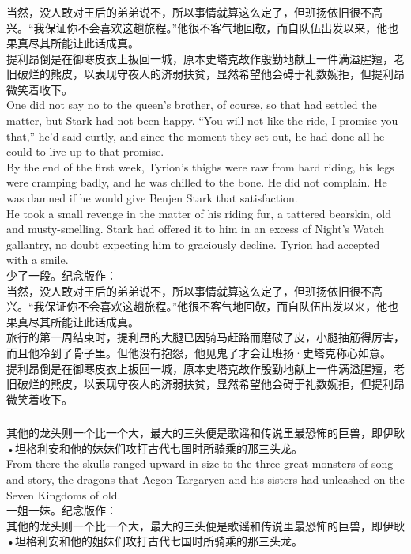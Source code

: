\documentclass[12pt,a4paper]{article}
\newcommand{\h}[1]{{\color{red}#1}\\}
\newcommand{\la}[1]{{\color{blue}#1}\\}
\begin{document}
\subsubsection{}\la{
当然，没人敢对王后的弟弟说不，所以事情就算这么定了，但班扬依旧很不高兴。“我保证你不会喜欢这趟旅程。”他很不客气地回敬，而自队伍出发以来，他也果真尽其所能让此话成真。\\
提利昂倒是在御寒皮衣上扳回一城，原本史塔克故作殷勤地献上一件满溢腥羶，老旧破烂的熊皮，以表现守夜人的济弱扶贫，显然希望他会碍于礼数婉拒，但提利昂微笑着收下。\\
One did not say no to the queen's brother, of course, so that had settled the matter, but Stark had not been happy. “You will not like the ride, I promise you that,” he'd said curtly, and since the moment they set out, he had done all he could to live up to that promise.\\
By the end of the first week, Tyrion's thighs were raw from hard riding, his legs were cramping badly, and he was chilled to the bone. He did not complain. He was damned if he would give Benjen Stark that satisfaction.\\ He took a small revenge in the matter of his riding fur, a tattered bearskin, old and musty-smelling. Stark had offered it to him in an excess of Night's Watch gallantry, no doubt expecting him to graciously decline. Tyrion had accepted with a smile.}\h{
少了一段。纪念版作：}
当然，没人敢对王后的弟弟说不，所以事情就算这么定了，但班扬依旧很不高兴。“我保证你不会喜欢这趟旅程。”他很不客气地回敬，而自队伍出发以来，他也果真尽其所能让此话成真。\\
旅行的第一周结束时，提利昂的大腿已因骑马赶路而磨破了皮，小腿抽筋得厉害，而且他冷到了骨子里。但他没有抱怨，他见鬼了才会让班扬·史塔克称心如意。\\
提利昂倒是在御寒皮衣上扳回一城，原本史塔克故作殷勤地献上一件满溢腥羶，老旧破烂的熊皮，以表现守夜人的济弱扶贫，显然希望他会碍于礼数婉拒，但提利昂微笑着收下。
	
\subsubsection{}\la{
其他的龙头则一个比一个大，最大的三头便是歌谣和传说里最恐怖的巨兽，即伊耿•坦格利安和他的妹妹们攻打古代七国时所骑乘的那三头龙。\\
From there the skulls ranged upward in size to the three great monsters of song and story, the dragons that Aegon Targaryen and his sisters had unleashed on the Seven Kingdoms of old.}
\h{一姐一妹。纪念版作：}
其他的龙头则一个比一个大，最大的三头便是歌谣和传说里最恐怖的巨兽，即伊耿•坦格利安和他的姐妹们攻打古代七国时所骑乘的那三头龙。
		
\end{document}

